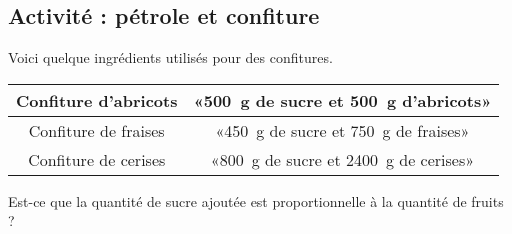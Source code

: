 
\subsection*{Activité : pétrole et confiture}

Voici quelque ingrédients utilisés pour des confitures.
\begin{center}
    \begin{tabular}[]{|c|c|}
        \hline
        Confiture d'abricots& «\SI{500}{\gram} de sucre et \SI{500}{\gram} d'abricots» \\
        \hline
        Confiture de fraises&«\SI{450}{\gram} de sucre et \SI{750}{\gram} de fraises» \\
        \hline
        Confiture de cerises&  «\SI{800}{\gram} de sucre et \SI{2400}{\gram} de cerises» \\ 
        \hline
    \end{tabular}
\end{center}
Est-ce que la quantité de sucre ajoutée est proportionnelle à la quantité de fruits ?


